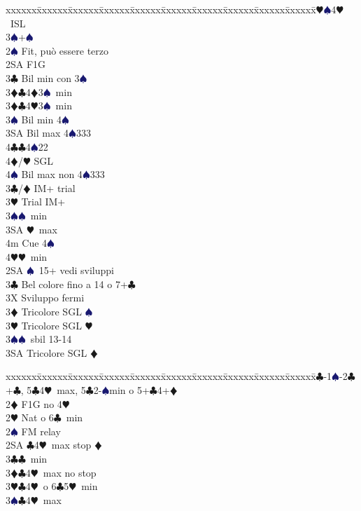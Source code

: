 \documentclass[a4paper,italian]{article}
\newcommand{\BC}{\textcolor{OliveGreen}{$\clubsuit$}}
\newcommand{\BD}{\textcolor{RedOrange}{$\vardiamondsuit$}}
\newcommand{\BH}{\textcolor{Red2}{$\varheartsuit${}}}
\newcommand{\BS}{\textcolor{MidnightBlue}{$\spadesuit${}}}
\newenvironment{bidtable}
{\begin{tabbing}

    xxxxxx\=xxxxxx\=xxxxxx\=xxxxxx\=xxxxxx\=xxxxxx\=xxxxxx\=xxxxxx\=xxxxxx\=xxxxxx\=\kill}
{\end{tabbing} }%
\begin{document}
\begin{multicols}{2}
\begin{bidtable}
        3\BH {}\BS 4\BH\ ISL\\
        3\BS {}+\BS \-\\
        2\BS \> Fit, può essere terzo\+\\
        2SA \> F1G\+\\
        3\BC \> Bil min con 3\BS \\
        3\BD {}\BC 4\BD 3\BS\ min\\
        3\BD {}\BC 4\BH 3\BS\ min\\
        3\BS \> Bil min 4\BS \\
        3SA \> Bil max 4\BS 333\\
        4\BC {}\BC 4\BS 22\\
        4\BD/\BH \> SGL\\
        4\BS \> Bil max non 4\BS 333\-\\
        3\BC/\BD \> IM+ trial\\
        3\BH \> Trial IM+\+\\
        3\BS {}\BS\ min\\
        3SA \BH\ max\\
        4m \> Cue 4\BS \\
        4\BH {}\BH\ min\-\-\\
        2SA \BS\ 15+ vedi sviluppi\\
        3\BC \> Bel colore fino a 14 o 7+\BC\+\\
        3X \> Sviluppo fermi\-\\
        3\BD \> Tricolore SGL \BS \\
        3\BH \> Tricolore SGL \BH \\
        3\BS {}\BS\ sbil 13-14\\
        3SA \> Tricolore SGL \BD \-
    \end{bidtable}
    \bigbreak
    \begin{bidtable}
    1\BC-1\BS-2\BC\>+\BC, 5\BC4\BH\ max, 5\BC2-\BS min o 5+\BC4+\BD\+\\
        2\BD \> F1G no 4\BH \+\\
        2\BH \> Nat o 6\BC\ min\+\\
        2\BS \> FM relay\+\\
        2SA \BC 4\BH\ max stop \BD \\
        3\BC {}\BC\ min\\
        3\BD {}\BC 4\BH\ max no stop\\
        3\BH {}\BC 4\BH\ o 6\BC 5\BH\ min\\
        3\BS {}\BC 4\BH\ max\-\\

\end{bidtable}
\end{multicols}
\end{document}

